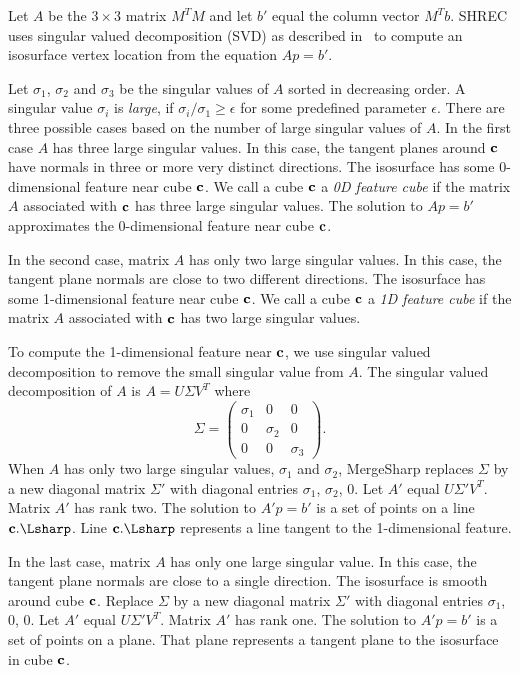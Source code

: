 Let $A$ be the $3 \times 3$ matrix $M^T M$ and 
let $b'$ equal the column vector $M^T b$.
SHREC uses singular valued decomposition (SVD)
as described in~\cite{jlsw-dchd-02,kbsh-fssev-01,l-oslpm-00}
to compute an isosurface vertex location from the equation $A p = b'$.

Let $\sigma_1$, $\sigma_2$ and $\sigma_3$ be the singular values of $A$
sorted in decreasing order.
A singular value $\sigma_i$ is {\em large},
if $\sigma_i/\sigma_1 \ge \epsilon$ for some predefined parameter $\epsilon$.
There are three possible cases based on the number of large singular values
of $A$.
In the first case $A$ has three large singular values.
In this case, the tangent planes around $\mathbf{c}$ have normals in three or more
very distinct directions.
The isosurface has some 0-dimensional feature near cube $\mathbf{c}$.
We call a cube $\mathbf{c}$ a {\em 0D feature cube} if the matrix $A$ associated
with $\mathbf{c}$ has three large singular values.
The solution to $A p = b'$ approximates the 0-dimensional feature 
near cube $\mathbf{c}$.

In the second case, matrix $A$ has only two large singular values.
In this case, 
the tangent plane normals are close to two different directions.
The isosurface has some 1-dimensional feature near cube $\mathbf{c}$.
We call a cube $\mathbf{c}$ a {\em 1D feature cube} if the matrix $A$ associated
with $\mathbf{c}$ has two large singular values.

To compute the 1-dimensional feature near $\mathbf{c}$,
we use singular valued decomposition to remove the small singular value
from $A$.
The singular valued decomposition of $A$ is $A = U \Sigma V^T$
where
\begin{equation*}
\Sigma = \left (
\begin{array}{ccc}
\sigma_1 & 0 & 0 \\
0 & \sigma_2 & 0 \\
0 & 0 & \sigma_3
\end{array}
\right )
.
\end{equation*}
When $A$ has only two large singular values, $\sigma_1$ and $\sigma_2$,
MergeSharp replaces $\Sigma$ by a new diagonal matrix $\Sigma'$
with diagonal entries $\sigma_1$, $\sigma_2$, 0.
Let $A'$ equal $U \Sigma' V^T$.
Matrix $A'$ has rank two.
The solution to $A' p = b'$ is a set of points on a line $\cb.\Lsharp$.
Line $\cb.\Lsharp$ represents a line tangent to the 1-dimensional feature.

In the last case,
matrix $A$ has only one large singular value.
In this case, the tangent plane normals are close to a single direction.
The isosurface is smooth around cube $\mathbf{c}$.
Replace $\Sigma$ by a new diagonal matrix $\Sigma'$
with diagonal entries $\sigma_1$, 0, 0.
Let $A'$ equal $U \Sigma' V^T$.
Matrix $A'$ has rank one.
The solution to $A' p = b'$ is a set of points on a plane.
That plane represents a tangent plane to the isosurface in cube $\mathbf{c}$.

